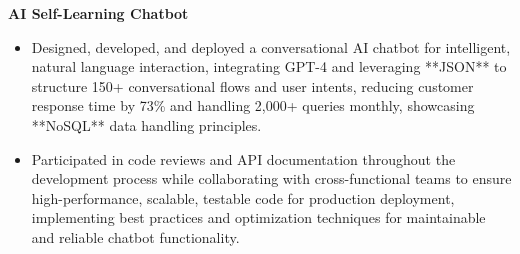 \documentclass[a4paper,10pt]{article}
\begin{document}
\vspace{-2mm}
\textbf{AI Self-Learning Chatbot} \\
\begin{itemize}[leftmargin=*, itemsep=0pt, parsep=1pt]
\vspace{-7mm}
    \item Designed, developed, and deployed a conversational AI chatbot for intelligent, natural language interaction, integrating GPT-4 and leveraging **JSON** to structure 150+ conversational flows and user intents, reducing customer response time by 73\% and handling 2,000+ queries monthly, showcasing **NoSQL** data handling principles.
    \item Participated in code reviews and API documentation throughout the development process while collaborating with cross-functional teams to ensure high-performance, scalable, testable code for production deployment, implementing best practices and optimization techniques for maintainable and reliable chatbot functionality.
\end{itemize}

\vspace{-2mm}
\end{document}
